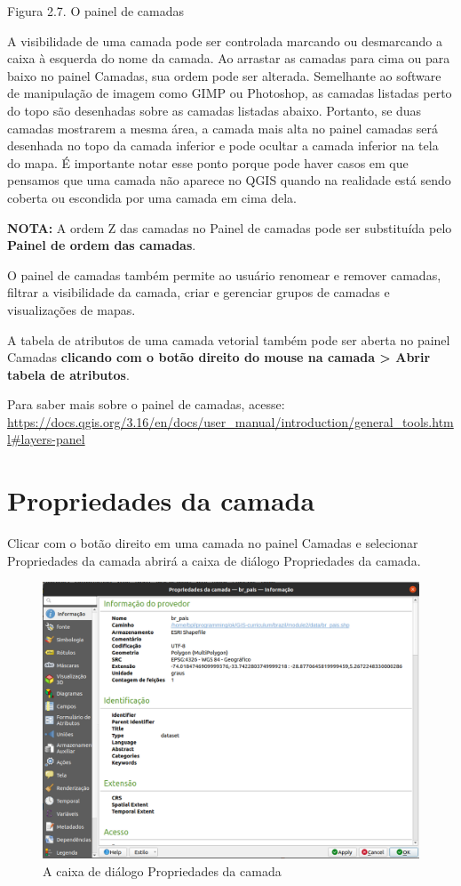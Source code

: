 \documentclass[
  portuguese,
]{krantz}
\begin{document}
Figura 2.7. O painel de camadas

A visibilidade de uma camada pode ser controlada marcando ou desmarcando a caixa à esquerda do nome da camada. Ao arrastar as camadas para cima ou para baixo no painel Camadas, sua ordem pode ser alterada. Semelhante ao software de manipulação de imagem como GIMP ou Photoshop, as camadas listadas perto do topo são desenhadas sobre as camadas listadas abaixo. Portanto, se duas camadas mostrarem a mesma área, a camada mais alta no painel camadas será desenhada no topo da camada inferior e pode ocultar a camada inferior na tela do mapa. É importante notar esse ponto porque pode haver casos em que pensamos que uma camada não aparece no QGIS quando na realidade está sendo coberta ou escondida por uma camada em cima dela.

\textbf{NOTA:} A ordem Z das camadas no Painel de camadas pode ser substituída pelo \textbf{Painel de ordem das camadas}.

O painel de camadas também permite ao usuário renomear e remover camadas, filtrar a visibilidade da camada, criar e gerenciar grupos de camadas e visualizações de mapas.

A tabela de atributos de uma camada vetorial também pode ser aberta no painel Camadas \textbf{clicando com o botão direito do mouse na camada \textgreater{} Abrir tabela de atributos}.

Para saber mais sobre o painel de camadas, acesse: \href{https://docs.qgis.org\%20/3.16/en/docs/user_manual/introduction/general_tools.html\#layers-panel}{https://docs.qgis.org/3.16/en/docs/user\_manual/introduction/general\_tools.html\#layers-panel}

\hypertarget{propriedades-da-camada}{%
\section{Propriedades da camada}\label{propriedades-da-camada}}

Clicar com o botão direito em uma camada no painel Camadas e selecionar Propriedades da camada abrirá a caixa de diálogo Propriedades da camada.

\begin{figure}
\centering
\includegraphics{media/modulo2/layer-properties.png}
\caption{A caixa de diálogo Propriedades da camada}
\end{figure}
\end{document}
